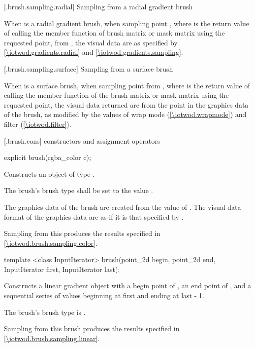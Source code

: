  [\iotwod.brush.sampling.radial] {Sampling from a radial gradient brush}

\pnum
When  is a radial gradient brush, when sampling point , where  is the return value of calling the  member function of brush matrix or mask matrix using the requested point, from , the visual data are as specified by \ref{\iotwod.gradients.radial} and \ref{\iotwod.gradients.sampling}.

 [\iotwod.brush.sampling.surface] {Sampling from a surface brush}

\pnum
When  is a surface brush, when sampling point  from , where  is the return value of calling the  member function of the brush matrix or mask matrix using the requested point, the visual data returned are from the point  in the graphics data of the brush, as modified by the values of wrap mode (\ref{\iotwod.wrapmode}) and filter (\ref{\iotwod.filter}).

 [\iotwod.brush.cons] { constructors and assignment operators}

%
\begin{itemdecl}
explicit brush(rgba_color c);
\end{itemdecl}
\begin{itemdescr}
\pnum
\effects
Constructs an object of type .

\pnum
The brush's brush type shall be set to the value .

\pnum
The graphics data of the brush are created from the value of . The visual data format of the graphics data are as-if it is that specified by .

\pnum
\remarks
Sampling from this produces the results specified in \ref{\iotwod.brush.sampling.color}.
\end{itemdescr}

%
\begin{itemdecl}
template <class InputIterator>
brush(point_2d begin, point_2d end,
  InputIterator first, InputIterator last);
\end{itemdecl}
\begin{itemdescr}
\pnum
\effects
Constructs a linear gradient  object with a begin point of , an end point of , and a sequential series of  values beginning at {first} and ending at {last - 1}.

\pnum
The brush's brush type is .

\pnum
\remarks
Sampling from this brush produces the results specified in \ref{\iotwod.brush.sampling.linear}.
\end{itemdescr}

